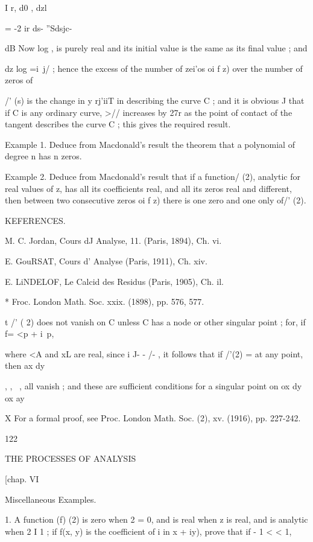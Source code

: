 I r, d0 , dzl

= -2 ir ds- ''Sdsjc-

dB Now log , is purely real and its initial value is the same as its
final value ; and

dz log =i\ j/ ; hence the excess of the number of zei'os oi f z) over
the number of zeros of

/' (s) is the change in y rj'iiT in describing the curve C ; and it is
obvious J that if C is any ordinary curve, >// increases by 27r as the
point of contact of the tangent describes the curve C ; this gives the
required result.

Example 1. Deduce from Macdonald's result the theorem that a
polynomial of degree n has n zeros.

Example 2. Deduce from Macdonald's result that if a function/ (2),
analytic for real values of z, has all its coefficients real, and all
its zeros real and different, then between two consecutive zeros oi f
z) there is one zero and one only of/' (2).



KEFERENCES.

M. C. Jordan, Cours dJ Analyse, 11. (Paris, 1894), Ch. vi.

E. GouRSAT, Cours d' Analyse (Paris, 1911), Ch. xiv.

E. LiNDELOF, Le Calcid des Residus (Paris, 1905), Ch. il.

* Froc. London Math. Soc. xxix. (1898), pp. 576, 577.

t /' ( 2) does not vanish on C unless C has a node or other singular
point ; for, if f= <p + i\ p,

where <A and xL are real, since i J- - /- , it follows that if /'(2) =
at any point, then ax dy

  , , ~, all vanish ; and these are sufficient conditions for a
singular point on ox dy ox ay

X For a formal proof, see Proc. London Math. Soc. (2), xv. (1916), pp.
227-242.



122



THE PROCESSES OF ANALYSIS



[chap. VI



Miscellaneous Examples.

1. A function (f) (2) is zero when 2 = 0, and is real when z is real,
and is analytic when 2 I 1 ; if f(x, y) is the coefficient of i in x +
iy), prove that if - 1 < < 1,



